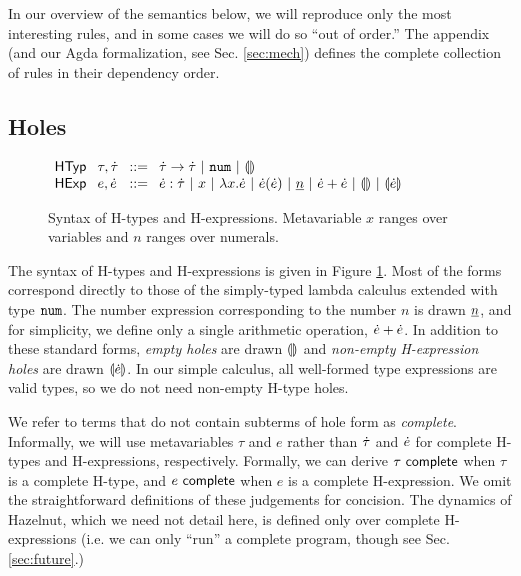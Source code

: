 \documentclass{llncs}
\begin{document}
In our overview of the semantics below, we will reproduce only the most interesting rules, and in some cases we will do so ``out of order.'' The appendix (and our Agda formalization, see Sec. \ref{sec:mech}) defines the complete collection of rules in their dependency order.
\subsection{Holes}\label{sec:holes}
\begin{figure}[t]
$\arraycolsep=4pt\begin{array}{lllllll}
\mathsf{HTyp} & \tau,\htau & ::= &
  \tarr{\htau}{\htau} ~\vert~
  \tnum ~\vert~
  \tehole\\
\mathsf{HExp} & e,\hexp & ::= &
  \hexp : \htau ~\vert~
  x ~\vert~
  \hlam{x}{\hexp} ~\vert~
  \hap{\hexp}{\hexp} ~\vert~
  \hnum{n} ~\vert~
  \hadd{\hexp}{\hexp} ~\vert~
  \hehole ~\vert~
  \hhole{\hexp}
\end{array}$
\caption{Syntax of H-types and H-expressions. Metavariable $x$ ranges over variables and $n$ ranges over numerals.}
\label{fig:hexp-syntax}
\end{figure}

The syntax of H-types and H-expressions is given in Figure \ref{fig:hexp-syntax}. Most of the forms correspond directly to those of the simply-typed lambda calculus extended with type $\texttt{num}$. The number expression corresponding to the number $n$ is drawn $\underline{n}$, and for simplicity, we define only a single arithmetic operation, $\dot{e} + \dot{e}$. 
In addition to these standard forms, \emph{empty holes} are drawn $\llparenthesis\rrparenthesis$ and \emph{non-empty H-expression holes} are drawn $\llparenthesis\dot{e}\rrparenthesis$. In our simple calculus, all well-formed type expressions are valid types, so we do not need non-empty H-type holes.%

We refer to terms that do not contain subterms of hole form as \emph{complete}. Informally, we will use metavariables $\tau$ and $e$ rather than $\dot{\tau}$ and $\dot{e}$ for complete H-types and H-expressions, respectively. Formally, we can derive $\tau~\mathsf{complete}$ when $\tau$ is a complete H-type, and $e~\mathsf{complete}$ when $e$ is a complete H-expression. We omit the straightforward definitions of these judgements for concision. The dynamics of Hazelnut, which we need not detail here, is defined only  over complete H-expressions (i.e. we can only ``run'' a complete program, though see Sec. \ref{sec:future}.)
\end{document}
